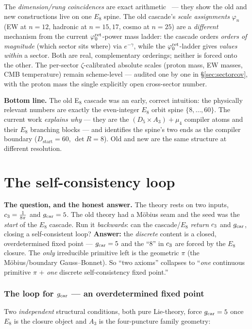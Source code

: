 \begin{gapbox}
The \emph{dimension/rung coincidences} are exact arithmetic \mE\ --- they show the old and new
constructions live on one $E_8$ spine. The old cascade's \emph{scale assignments} $\varphi_n$ (EW at
$n{=}12$, hadronic at $n{=}15,17$, cosmo at $n{=}25$) are a \emph{different} mechanism from the current
$\varphi_0^{\mathrm{ret}}$-power mass ladder: the cascade orders \emph{orders of magnitude} (which sector sits where) via
$e^{-\gamma}$, while the $\varphi_0^{\mathrm{ret}}$-ladder gives \emph{values within} a sector. Both are real, complementary
orderings; neither is forced onto the other. The per-sector $\zeta$-calibrated absolute scales (proton
mass, EW masses, CMB temperature) remain scheme-level --- audited one by one in
\S\ref{sec:sectorcov}, with the proton mass the single explicitly open cross-sector number.
\end{gapbox}

\noindent\textbf{Bottom line.} The old E$_8$ cascade was an early, correct intuition: the physically
relevant numbers are exactly the even-integer $E_8$ orbit spine $\{8,\dots,60\}$. The current work
\emph{explains why} --- they are the $(D_5\times A_3)+\mu_4$ compiler atoms and their $E_8$ branching
blocks --- and identifies the spine's two ends as the compiler boundary ($D_{\mathrm{start}}=60$,
$\det R=8$). Old and new are the same structure at different resolution.

\clearpage
\part{The self-consistency loop}
\noindent\textbf{The question, and the honest answer.}
The theory rests on two inputs, $c_3=\tfrac1{8\pi}$ and $g_{\mathrm{car}}=5$. The old theory had a Möbius seam
and the seed was the \emph{start} of the $E_8$ cascade. Run it \emph{backwards}: can the cascade/$E_8$
\emph{return} $c_3$ and $g_{\mathrm{car}}$, closing a self-consistent loop? \textbf{Answer:} the \emph{discrete}
content is a closed, overdetermined fixed point --- $g_{\mathrm{car}}=5$ and the ``$8$'' in $c_3$ are forced by
the $E_8$ closure. The \emph{only} irreducible primitive left is the geometric $\pi$ (the Möbius/boundary
Gauss--Bonnet). So ``two axioms'' collapses to ``\emph{one} continuous primitive $\pi$ $+$ \emph{one}
discrete self-consistency fixed point.''

\section{The loop for $g_{\mathrm{car}}$ --- an overdetermined fixed point}
Two \emph{independent} structural conditions, both pure Lie-theory, force $g_{\mathrm{car}}=5$ once $E_8$ is the
closure object and $A_3$ is the four-puncture family geometry:

